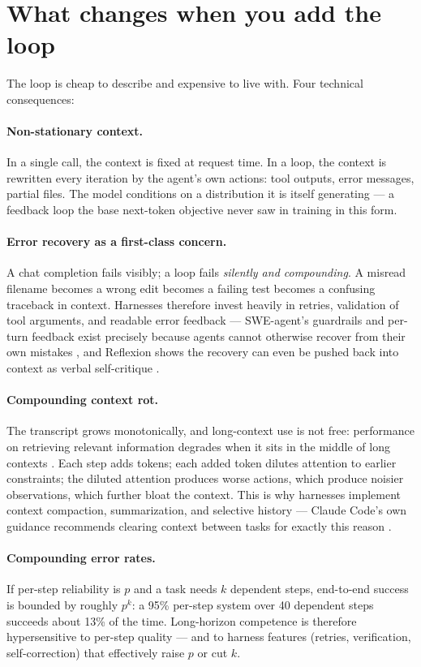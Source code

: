 \documentclass[11pt]{article}
\begin{document}
\section{What changes when you add the loop}
The loop is cheap to describe and expensive to live with. Four technical consequences:

\paragraph{Non-stationary context.} In a single call, the context is fixed at request time. In a loop, the context is rewritten every iteration by the agent's own actions: tool outputs, error messages, partial files. The model conditions on a distribution it is itself generating --- a feedback loop the base next-token objective never saw in training in this form.

\paragraph{Error recovery as a first-class concern.} A chat completion fails visibly; a loop fails \emph{silently and compounding}. A misread filename becomes a wrong edit becomes a failing test becomes a confusing traceback in context. Harnesses therefore invest heavily in retries, validation of tool arguments, and readable error feedback --- SWE-agent's guardrails and per-turn feedback exist precisely because agents cannot otherwise recover from their own mistakes \cite{yang2024sweagent}, and Reflexion shows the recovery can even be pushed back into context as verbal self-critique \cite{shinn2023reflexion}.

\paragraph{Compounding context rot.} The transcript grows monotonically, and long-context use is not free: performance on retrieving relevant information degrades when it sits in the middle of long contexts \cite{liu2024lost}. Each step adds tokens; each added token dilutes attention to earlier constraints; the diluted attention produces worse actions, which produce noisier observations, which further bloat the context. This is why harnesses implement context compaction, summarization, and selective history --- Claude Code's own guidance recommends clearing context between tasks for exactly this reason \cite{anthropic2025claudecode}.

\paragraph{Compounding error rates.} If per-step reliability is $p$ and a task needs $k$ dependent steps, end-to-end success is bounded by roughly $p^k$: a 95\% per-step system over 40 dependent steps succeeds about 13\% of the time. Long-horizon competence is therefore hypersensitive to per-step quality --- and to harness features (retries, verification, self-correction) that effectively raise $p$ or cut $k$.
\end{document}
